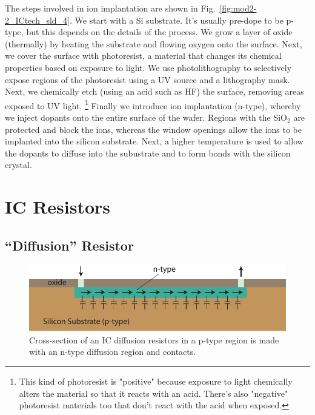 The steps involved in ion implantation are shown in Fig.~\ref{fig:mod2-2_ICtech_sld_4}.  We start with a Si substrate.  It's usually pre-dope to be p-type, but this depends on the details of the process.  We grow a layer of oxide (thermally) by heating the substrate and flowing oxygen onto the surface.  Next, we cover the surface with photoresist, a material that changes its chemical properties based on exposure to light.  We use photolithography to selectively expose regions of the photoresist using a UV source and a lithography mask.  Next, we chemically etch (using an acid such as HF)  the surface, removing areas exposed to UV light.  \footnote{This kind of photoresist is "positive" because exposure to light chemically alters the material so that it reacts with an acid. There's also  "negative" photoresist materials too that don't react with the acid when exposed.}    Finally we introduce ion implantation (n-type), whereby we inject dopants onto the entire surface of the wafer.  Regions with the SiO$_2$ are protected and block the ions, whereas the window openings allow the ions to be implanted into the silicon substrate.  Next, a higher temperature is used to allow the dopants to diffuse into the subustrate and to form bonds with the silicon crystal. 
\section{IC Resistors}
\subsection{“Diffusion” Resistor}
\begin{figure}[tb]
\begin{center}
\includegraphics[width=.7\columnwidth]{diff_resistor}
\end{center}
\caption{Cross-section of an IC diffusion resistors in a p-type region is made with an n-type diffusion region and contacts.}
\label{fig:mod2-2_ICtech_sld_5}
\end{figure}

